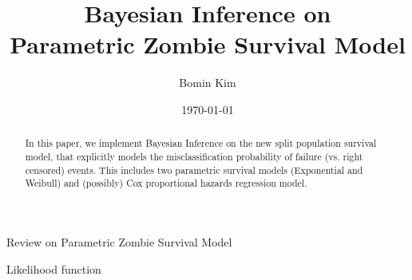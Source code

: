 \documentclass[a4paper, 12pt]{article}
\makeatletter
\renewcommand{\section}{\@startsection
{section}    {1}    {0mm}    {-0.7\baselineskip}    {0.08\baselineskip}    {\normalfont\large\sc\center\bf}}
\renewcommand{\subsection}{\@startsection
{subsection}    {2}    {0mm}    {-0.5\baselineskip}    {0.01\baselineskip}    {\normalfont\normalsize\itshape\center}}
\makeatother
\begin{document}
\date{\today }
\title{Bayesian Inference on \\
Parametric Zombie Survival Model}
\author{Bomin Kim}
\maketitle

\begin{abstract}
\noindent In this paper, we implement Bayesian Inference on the new split
population survival model, that explicitly models the misclassification
probability of failure (vs. right censored) events. This includes two
parametric survival models (Exponential and Weibull) and (possibly) Cox
proportional hazards regression model.
\end{abstract}


\clearpage\pagebreak \renewcommand{\thefigure}{\arabic{figure}} %
\setcounter{figure}{0} \renewcommand{\thepage}{\arabic{page}} %
\setcounter{page}{1} \pagestyle{plain} \doublespacing

\section{Review on Parametric Zombie Survival Model}

\subsection{Likelihood function}
\end{document}
